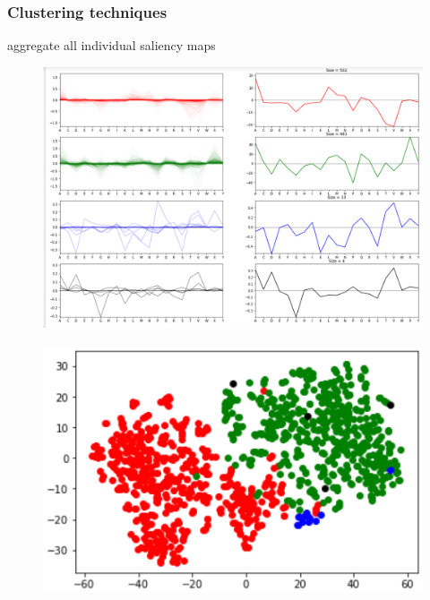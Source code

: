 		\subsubsection*{Clustering techniques}
		aggregate all individual saliency maps %
		
		\begin{figure}
		\centering
		\includegraphics[width=1\linewidth]{Figures/clusters}
		\caption{}
		\label{fig:clusters}
		\end{figure}
		
		\begin{figure}
		\centering
		\includegraphics[width=0.7\linewidth]{tsne}
		\caption{}
		\label{fig:tsne}
		\end{figure}

